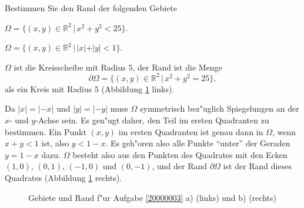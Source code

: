 Bestimmen Sie den Rand der folgenden Gebiete
\begin{teilaufgaben}
\item
$\Omega=\{(x,y)\in\mathbb R^2\,|\, x^2+y^2<25\}$.
\item
$\Omega=\{(x,y)\in\mathbb R^2\,|\, |x|+|y|<1\}$.
\end{teilaufgaben}

\begin{loesung}
\begin{teilaufgaben}
\item
$\Omega$ ist die Kreisscheibe mit Radius $5$, der Rand ist die Menge
\[
\partial\Omega=\{(x,y)\in\mathbb R^2\,|\, x^2+y^2=25\},
\]
als ein Kreis mit Radius $5$ (Abbildung \ref{20000003:fig} links).
\item
Da $|x|=|-x|$ und $|y|=|-y|$ muss $\Omega$ symmetrisch bez"uglich
Spiegelungen an der $x$- und $y$-Achse sein. Es gen"ugt daher,
den Teil im ersten Quadranten zu bestimmen.  Ein Punkt $(x,y)$
im ersten Quadranten ist genau dann in $\Omega$, wenn $x+y<1$ ist,
also $y<1-x$. Es geh"oren also alle Punkte ``unter'' der Geraden
$y=1-x$ dazu. $\Omega$ besteht also aus den Punkten des
Quadrates mit den Ecken $(1,0)$, $(0,1)$, $(-1,0)$ und $(0,-1)$,
und der Rand $\partial\Omega$ ist der Rand dieses Quadrates
(Abbildung \ref{20000003:fig} rechts).
\qedhere
\end{teilaufgaben}
\begin{figure}
\begin{center}
\qquad
{}
\end{center}
\caption{Gebiete und Rand f"ur Aufgabe \ref{20000003} a) (links)
und b) (rechts)\label{20000003:fig}}
\end{figure}
\end{loesung}
